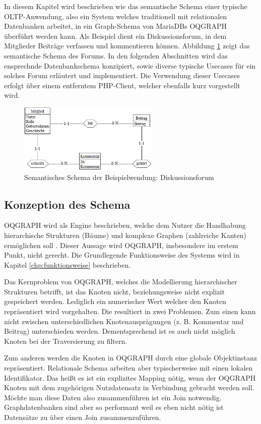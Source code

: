 In diesem Kapitel wird beschrieben wie das semantische Schema einer typische OLTP-Anwendung, also ein System welches traditionell mit relationalen Datenbanken arbeitet, in ein Graph-Schema von MariaDBs OQGRAPH überführt werden kann. Als Beispiel dient ein Diskussionsforum, in dem Mitglieder Beiträge verfassen und kommentieren können. Abbildung \ref{fig:semanticSchema} zeigt das semantische Schema des Forums. In den folgenden Abschnitten wird das ensprechnde Datenbankschema konzipiert, sowie diverse typische Usecases für ein solches Forum erläutert und implementiert. Die Verwendung dieser Usecases erfolgt über einem entferntem PHP-Client, welcher ebenfalls kurz vorgestellt wird.

\begin{figure}
	\centering
	\includegraphics[width=0.6\textwidth]{images/semantischesSchema.png}	
	\caption{Semantisches Schema der Beispielwendung: Diskussionsforum}
	\label{fig:semanticSchema}
\end{figure}

\subsection{Konzeption des Schema}
OQGRAPH wird als Engine beschrieben, welche dem Nutzer die Handhabung hierarchische Strukturen (Bäume) und komplexe Graphen (zahlreiche Kanten) ermöglichen soll \cite{oqgraph}. Dieser Aussage wird OQGRAPH, insbesondere im erstem Punkt, nicht gerecht. Die Grundlegende Funktionsweise des Systems wird in Kapitel \ref{chp:funktionsweise} beschrieben.

Das Kernproblem von OQGRAPH, welches die Modellierung hierarchischer Strukturen betrifft, ist das Knoten nicht, beziehungsweise nicht explizit gespeichert werden. Lediglich ein numerischer Wert welcher den Knoten repräsentiert wird vorgehalten. Die resultiert in zwei Problemen. Zum einen kann nicht zwischen unterschiedlichen Knotenausprägungen (z. B. Kommentar und Beitrag) unterschieden werden. Dementsprechend ist es auch nicht möglich Knoten bei der Traversierung zu filtern. 

Zum anderen werden die Knoten in OQGRAPH durch eine globale Objektinstanz repräsentiert. Relationale Schema arbeiten aber typischerweise mit einen lokalen Identifikator. Das heißt es ist ein explizites Mapping nötig, wenn der OQGRAPH Knoten mit dem zugehörigen Nutzdatensatz in Verbindung gebracht werden soll. Möchte man diese Daten also zusammenführen ist ein Join notwendig. Graphdatenbanken sind aber so performant weil es eben nicht nötig ist Datensätze zu über einen Join zusammenzuführen.

